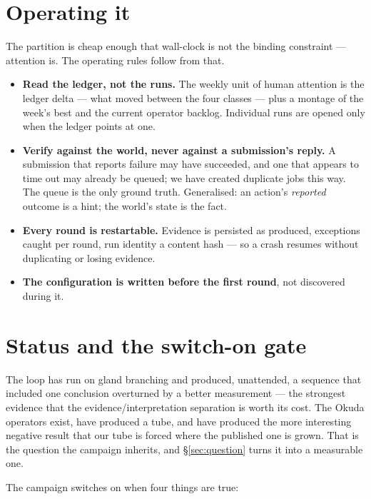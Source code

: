 \documentclass[11pt]{article}
\begin{document}
\section{Operating it}

The partition is cheap enough that wall-clock is not the binding constraint --- attention is. The
operating rules follow from that.

\begin{itemize}\itemsep2pt
\item \textbf{Read the ledger, not the runs.} The weekly unit of human attention is the ledger
delta --- what moved between the four classes --- plus a montage of the week's best and the
current operator backlog. Individual runs are opened only when the ledger points at one.
\item \textbf{Verify against the world, never against a submission's reply.} A submission that
reports failure may have succeeded, and one that appears to time out may already be queued; we
have created duplicate jobs this way. The queue is the only ground truth. Generalised: an action's
\emph{reported} outcome is a hint; the world's state is the fact.
\item \textbf{Every round is restartable.} Evidence is persisted as produced, exceptions caught per
round, run identity a content hash --- so a crash resumes without duplicating or losing evidence.
\item \textbf{The configuration is written before the first round}, not discovered during it.
\end{itemize}

\section{Status and the switch-on gate}

The loop has run on gland branching and produced, unattended, a sequence that included one
conclusion overturned by a better measurement --- the strongest evidence that the
evidence/interpretation separation is worth its cost. The Okuda operators exist, have produced a
tube, and have produced the more interesting negative result that our tube is forced where the
published one is grown. That is the question the campaign inherits, and \S\ref{sec:question}
turns it into a measurable one.

The campaign switches on when four things are true:
\end{document}
